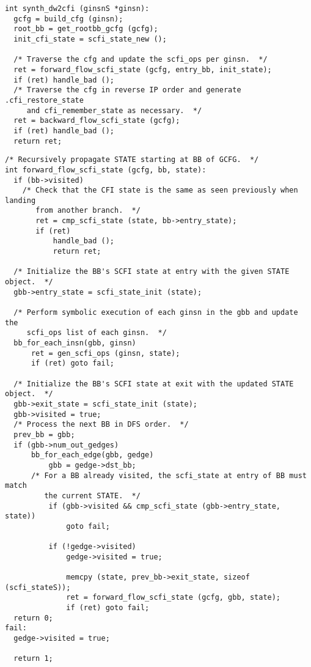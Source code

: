 \documentclass{article} \usepackage[a4paper, total={6in, 8in}]{geometry}
\begin{document}
\begin{verbatim}
int synth_dw2cfi (ginsnS *ginsn):
  gcfg = build_cfg (ginsn);
  root_bb = get_rootbb_gcfg (gcfg);
  init_cfi_state = scfi_state_new ();

  /* Traverse the cfg and update the scfi_ops per ginsn.  */
  ret = forward_flow_scfi_state (gcfg, entry_bb, init_state);
  if (ret) handle_bad ();
  /* Traverse the cfg in reverse IP order and generate .cfi_restore_state
     and cfi_remember_state as necessary.  */
  ret = backward_flow_scfi_state (gcfg);
  if (ret) handle_bad ();
  return ret;
\end{verbatim}
\begin{verbatim}
/* Recursively propagate STATE starting at BB of GCFG.  */
int forward_flow_scfi_state (gcfg, bb, state):
  if (bb->visited)
    /* Check that the CFI state is the same as seen previously when landing
       from another branch.  */
       ret = cmp_scfi_state (state, bb->entry_state);
       if (ret)
           handle_bad ();
           return ret;

  /* Initialize the BB's SCFI state at entry with the given STATE object.  */
  gbb->entry_state = scfi_state_init (state);

  /* Perform symbolic execution of each ginsn in the gbb and update the
     scfi_ops list of each ginsn.  */
  bb_for_each_insn(gbb, ginsn)
      ret = gen_scfi_ops (ginsn, state);
      if (ret) goto fail;

  /* Initialize the BB's SCFI state at exit with the updated STATE object.  */
  gbb->exit_state = scfi_state_init (state);
  gbb->visited = true;
  /* Process the next BB in DFS order.  */
  prev_bb = gbb;
  if (gbb->num_out_gedges)
      bb_for_each_edge(gbb, gedge)
          gbb = gedge->dst_bb;
	  /* For a BB already visited, the scfi_state at entry of BB must match
	     the current STATE.  */
          if (gbb->visited && cmp_scfi_state (gbb->entry_state, state))
              goto fail;

          if (!gedge->visited)
              gedge->visited = true;

              memcpy (state, prev_bb->exit_state, sizeof (scfi_stateS));
              ret = forward_flow_scfi_state (gcfg, gbb, state);
              if (ret) goto fail;
  return 0;
fail:
  gedge->visited = true;

  return 1;
\end{verbatim}
\end{document}

